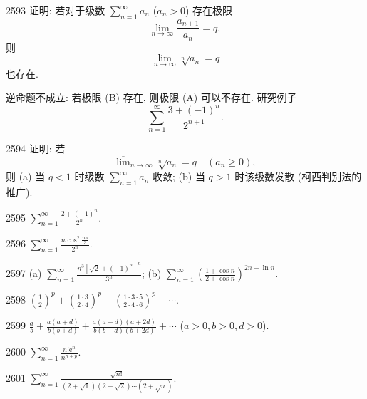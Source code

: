 \begin{prob}[M]{2593}
证明: 若对于级数 $\sum_{n=1}^{\infty} a_n$ ($a_n > 0$) 存在极限
\[
\lim_{n\to\infty} \frac{a_{n+1}}{a_n} = q, \tag{A}
\]
则
\[
\lim_{n\to\infty} \sqrt[n]{a_n} = q \tag{B}
\]
也存在.

逆命题不成立: 若极限 (B) 存在, 则极限 (A) 可以不存在. 研究例子
\[
\sum_{n=1}^{\infty} \frac{3 + (-1)^n}{2^{n+1}}.
\]
\end{prob}

\begin{prob}[M]{2594}
证明: 若
\[
\overline{\lim}_{n\to\infty} \sqrt[n]{a_n} = q \quad (a_n \geqslant 0),
\]
则 (a) 当 $q < 1$ 时级数 $\sum_{n=1}^{\infty} a_n$ 收敛; (b) 当 $q > 1$ 时该级数发散 (柯西判别法的推广).
\end{prob}


\begin{prob}[S]{2595}
$\sum_{n=1}^{\infty} \frac{2 + (-1)^n}{2^n}$.
\end{prob}

\begin{prob}[S]{2596}
$\sum_{n=1}^{\infty} \frac{n \cos^2 \frac{n\pi}{3}}{2^n}$.
\end{prob}

\begin{prob}[M]{2597}
(a) $\sum_{n=1}^{\infty} \frac{n^3 [\sqrt{2} + (-1)^n]^n}{3^n}$; \qquad (b) $\sum_{n=1}^{\infty} \left(\frac{1 + \cos n}{2 + \cos n}\right)^{2n - \ln n}$.
\end{prob}


\begin{prob}[S]{2598}
$\left(\frac{1}{2}\right)^p + \left(\frac{1 \cdot 3}{2 \cdot 4}\right)^p + \left(\frac{1 \cdot 3 \cdot 5}{2 \cdot 4 \cdot 6}\right)^p + \cdots$.
\end{prob}

\begin{prob}[S]{2599}
$\frac{a}{b} + \frac{a(a+d)}{b(b+d)} + \frac{a(a+d)(a+2d)}{b(b+d)(b+2d)} + \cdots$ ($a > 0, b > 0, d > 0$).
\end{prob}

\begin{prob}[S]{2600}
$\sum_{n=1}^{\infty} \frac{n!\mathrm{e}^n}{n^{n+p}}$.
\end{prob}

\begin{prob}[S]{2601}
$\sum_{n=1}^{\infty} \frac{\sqrt{n!}}{(2+\sqrt{1})(2+\sqrt{2})\cdots(2+\sqrt{n})}$.
\end{prob}

